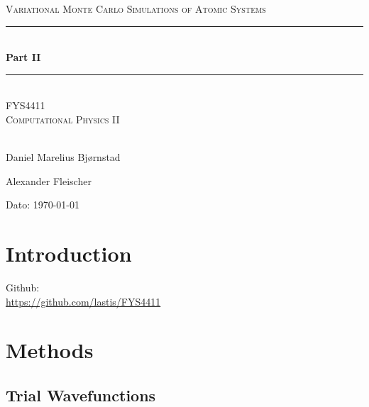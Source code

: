 \documentclass[twocolumn,12pt]{extarticle}
\title{}
\begin{document}
\begin{titlepage}
\begin{center}

\textsc{\Large Variational Monte Carlo Simulations of Atomic Systems}\\[0.5cm]
\rule{\linewidth}{0.5mm} \\[0.4cm]
{ \huge \bfseries  Part II}\\[0.10cm]
\rule{\linewidth}{0.5mm} \\[1.5cm]
\textsc{\Large FYS4411}\\
\textsc{\Large Computational Physics II}\\[1.5cm]
\textsc{}\\[1.5cm]

\begin{minipage}{0.49\textwidth}
    \begin{center} \large
		Daniel Marelius Bj\o rnstad
    \end{center}
\end{minipage}
\begin{minipage}{0.49\textwidth}
    \begin{center} \large
        Alexander Fleischer
    \end{center}
\end{minipage}

\vfill

\large{Dato: \today}

\end{center}
\end{titlepage}
\date{}
\maketitle

\section{Introduction}
Github: \\ \url{https://github.com/lastis/FYS4411}

\section{Methods}
\subsection{Trial Wavefunctions}
\end{document}
